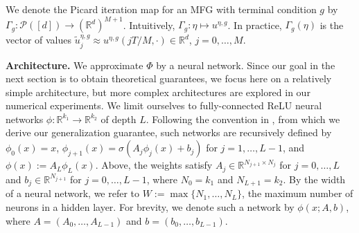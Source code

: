 \documentclass[11pt,reqno]{amsart}
\numberwithin{equation}{section}
\theoremstyle{plain}
\newcommand{\R}{\mathbb{R}}
\newcommand{\calP}{{\mathcal P}}
\newcommand{\1}{\boldsymbol{\mathbbm{1}}}
\begin{document}
We denote the Picard iteration map for an MFG with terminal condition $g$ by $\Gamma_g : \calP([d]) \to (\R^{d})^{M + 1}$. Intuitively, $\Gamma_g: \eta \mapsto u^{\eta, g}$. In practice, $\Gamma_g(\eta)$ is the vector of values $\tilde{u}^{\eta,g}_j \approx u^{\eta, g}(j T / M, \cdot) \in \R^d$, $j=0,\dots,M$.

\noindent\textbf{Architecture.} We approximate $\Phi$ by a neural network. Since our goal in the next section is to obtain theoretical guarantees, we focus here on a relatively simple architecture, but more complex architectures are explored in our numerical experiments. We limit ourselves to fully-connected ReLU neural networks $\phi : \R^{k_1} \to \R^{k_2}$ of depth $L$. Following the convention in \cite{Jiao2023}, from which we derive our generalization guarantee, such networks are recursively defined by $\phi_0(x) = x$, $\phi_{j + 1}(x) = \sigma(A_j \phi_{j}(x) + b_{j})$ for $j = 1, \ldots, L - 1$, and $\phi(x) := A_L \phi_L(x)$. Above, the weights satisfy $A_{j} \in \R^{N_{j + 1} \times N_{j}}$ for $j = 0, \ldots, L$ and $b_{j} \in \R^{N_{j + 1}}$ for $j = 0, \ldots, L - 1$, where $N_0 = k_1$ and $N_{L + 1} = k_2$. By the width of a neural network, we refer to $W := \max\{N_1, \ldots, N_L\}$, the maximum number of neurons in a hidden layer. For brevity, we denote such a network by $\phi(x; A, b)$, where $A = (A_0,\dots,A_{L-1})$ and $b = (b_0,\dots,b_{L-1})$.
\end{document}
